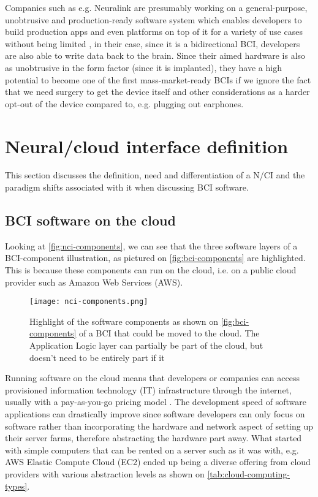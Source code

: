 Companies such as e.g. Neuralink are presumably working on a general-purpose, unobtrusive and production-ready software system which enables developers to build production apps and even platforms on top of it for a variety of use cases without being limited \citep{musk_integrated_2019}, in their case, since it is a bidirectional BCI, developers are also able to write data back to the brain. Since their aimed hardware is also as unobtrusive in the form factor (since it is implanted), they have a high potential to become one of the first mass-market-ready BCIs if we ignore the fact that we need surgery to get the device itself \citep{neuralink_approach_nodate} and other considerations as a harder opt-out of the device compared to, e.g. plugging out earphones.

\section{Neural/cloud interface definition}
\label{chapter2-neural-cloud-interface-definition}

This section discusses the definition, need and differentiation of a N/CI and the paradigm shifts associated with it when discussing BCI software.

\subsection{BCI software on the cloud}
\label{chapter2-bci-software-on-the-cloud}

Looking at \autoref{fig:nci-components}, we can see that the three software layers of a BCI-component illustration, as pictured on \autoref{fig:bci-components} are highlighted. This is because these components can run on the cloud, i.e. on a public cloud provider such as Amazon Web Services (AWS).

\begin{figure}[!ht]
  \centering
  \texttt{[image: nci-components.png]}
  \caption{Highlight of the software components as shown on \autoref{fig:bci-components} of a BCI that could be moved to the cloud. The Application Logic layer can partially be part of the cloud, but doesn't need to be entirely part if it}
  \label{fig:nci-components}
\end{figure}

Running software on the cloud means that developers or companies can access provisioned information technology (IT) infrastructure through the internet, usually with a pay-as-you-go pricing model \citep{amazon_web_services_inc_what_nodate}. The development speed of software applications can drastically improve since software developers can only focus on software rather than incorporating the hardware and network aspect of setting up their server farms, therefore abstracting the hardware part away. What started with simple computers that can be rented on a server such as it was with, e.g. AWS Elastic Compute Cloud (EC2) \citep{barr_amazon_2006} ended up being a diverse offering from cloud providers with various abstraction levels as shown on \autoref{tab:cloud-computing-types}.

